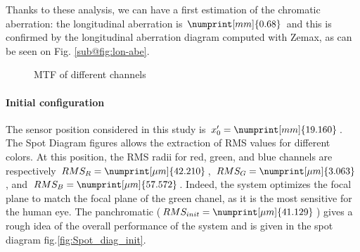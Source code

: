 \documentclass[10pt,letterpaper]{article}
\begin{document}
Thanks to these analysis, we can have a first estimation of the chromatic aberration: the longitudinal aberration is $\numprint[mm]{0.68}$ and this is confirmed by the longitudinal aberration diagram computed with Zemax, as can be seen on Fig. \ref{sub@fig:lon-abe}.
\begin{figure}[h]
    \centering
	\caption{MTF of different channels}
    \label{fig:fft-colors}
\end{figure}

\paragraph{Initial configuration\\}
The sensor position considered in this study is $x'_0 = \numprint[mm]{19.160}$. The Spot Diagram figures allows the extraction of RMS values for different colors. At this position, the RMS radii for red, green, and blue channels are respectively $RMS_R = \numprint[\mu m]{42.210}$, $RMS_G = \numprint[\mu m]{3.063}$, and $RMS_B = \numprint[\mu m]{57.572}$. Indeed, the system optimizes the focal plane to match the focal plane of the green chanel, as it is the most sensitive for the human eye. The panchromatic ($RMS_{init} = \numprint[\mu m]{41.129}$) gives a rough idea of the overall performance of the system and is given in the spot diagram fig.\ref{fig:Spot_diag_init}.
\end{document}
